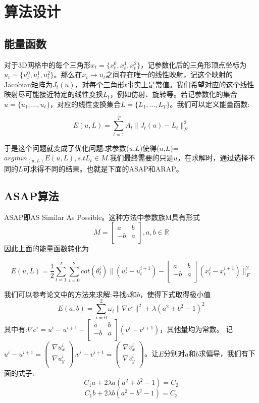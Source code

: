 \documentclass{article}
\begin{document}
	
	\section{算法设计}
	
	
	 \subsection{能量函数}
	 
	 	对于3D网格中的每个三角形$x_t=\{x^0_t,x^1_t,x^2_t \}$，记参数化后的三角形顶点坐标为$u_t=\{u^0_t,u^1_t,u^2_t \}$。那么在$x_t \rightarrow u_t$之间存在唯一的线性映射，记这个映射的Jacobian矩阵为$J_t(u)$，对每个三角形$t$事实上是常值。我们希望对应的这个线性映射尽可能接近特定的线性变换$L_t$，例如仿射、旋转等。若记参数化的集合$u=\{u_1,...,u_t \}$，对应的线性变换集合$L=\{L_1,...,L_T \}$。我们可以定义能量函数:
	 
	 $$   E(u,L)=\sum_{t=1}^{T}A_t   \lVert J_t(u)-L_t  \rVert_F^2   $$
	 
	 于是这个问题就变成了优化问题:求参数($u$,$L$)使得($u$,$L$)=$argmin_{(u,L)}E(u,L) , s.t L_t \in M$.我们最终需要的只是$u$，在求解时，通过选择不同的$L$可求得不同的结果。也就是下面的ASAP和ARAP。
	
	
	\subsection{ASAP算法}
	
	ASAP即AS Similar As Possible。这种方法中参数族M具有形式
$$
M = \left[ \begin{array}{cc}
	a & b \\
	-b & a \\
\end{array} \right],a,b\in \mathbb{R}
$$
	因此上面的能量函数转化为
	
	$$   E(u,L)=\frac{1}{2} \sum_{t=1}^{T}\sum_{i=0}^{2} cot(\theta_t^i)   \lVert(u_t^i-u_t^{i+1})    - \left[ \begin{matrix}
		a & b \\
	   -b & a \\
	\end{matrix} \right] (x_t^i-x_t^{i+1}) \rVert_F^2   $$
	
   我们可以参考论文中的方法来求解:寻找$a$和$b$，使得下式取得极小值
   $$ E(a,b)=\sum_{i=0}^2 \omega_i \lVert \nabla e^i \rVert^2 + \lambda(a^2+b^2-1)^2 $$
   其中有:$\nabla e^i=u^i-u^{i+1} - \left[ \begin{matrix}
   	a & b \\
   	-b & a \\
   \end{matrix} \right] (v^i-v^{i+1}) $，其他量均为常数。
 记$u^i-u^{i+1}=
 \begin{pmatrix}
 	\nabla u_x^i \\
 	\nabla u_y^i \\
 \end{pmatrix} 
$,$v^i-v^{i+1}=
\begin{pmatrix}
	\nabla v_x^i \\
	\nabla v_y^i \\
\end{pmatrix} 
$。让$E$分别对$a$和$b$求偏导，我们有下面的式子:
$$ C_1a+2\lambda a(a^2+b^2-1) = C_2 $$
$$ C_1b+2\lambda b(a^2+b^2-1) = C_3 $$
\end{document}
